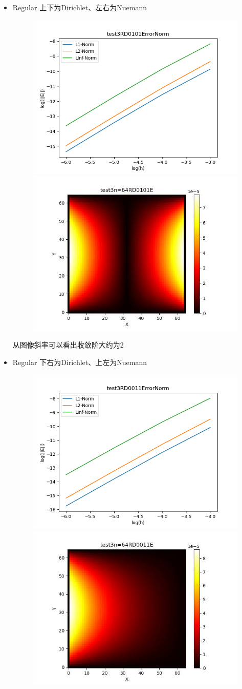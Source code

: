 \documentclass{article}
\begin{document}
\begin{itemize}
    \item Regular 上下为Dirichlet、左右为Nuemann
    \begin{figure}[h]
        \centering
        \includegraphics[width=0.35\linewidth]{test3RD0101ErrorNormjpg.png}
        \includegraphics[width=0.35\linewidth]{test3n=64RD0101E.jpg}
    \end{figure}

    从图像斜率可以看出收敛阶大约为2
    \newpage
    \item Regular 下右为Dirichlet、上左为Nuemann
    \begin{figure}[h]
        \centering
        \includegraphics[width=0.35\linewidth]{test3RD0011ErrorNormjpg.png}
        \includegraphics[width=0.35\linewidth]{test3n=64RD0011E.jpg}
    \end{figure}
    

\end{itemize}
\end{document}
